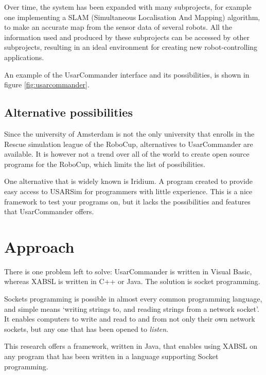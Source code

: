 \documentclass[a4paper,10pt]{article}
\begin{document}
Over time, the system has been expanded with many subprojects, for example one
implementing a SLAM
(Simultaneous Localisation And Mapping) algorithm, to make an accurate map from
the sensor data of several robots\cite{slamet2006manifoldslam}. All the information used and produced by
these subprojects can be accessed by other subprojects, resulting in an ideal
environment for creating new robot-controlling applications.

An example of the UsarCommander interface and its possibilities, is shown in
figure \ref{fig:usarcommander}.

\subsection{Alternative possibilities}
Since the university of Amsterdam is not the only university that enrolls in the
Rescue simulation league of the RoboCup, alternatives to UsarCommander are
available. It is however not a trend over all of the world to create open source
programs for the RoboCup, which limits the list of possibilities.

One alternative that is widely known is Iridium. A program created to provide
easy access to USARSim for programmers with little experience. This is a nice
framework to test your programs on, but it lacks the possibilities and features that
UsarCommander offers. 

\section{Approach}
There is one problem left to solve: UsarCommander is written in Visual Basic,
whereas XABSL is written in C++ or Java. The solution is socket programming.

Sockets programming is possible in almost every common programming language, and
simple means `writing strings to, and reading strings from a network socket'.
It enables computers to write and read to and from not only their own network
sockets, but any one that has been opened to \textit{listen}. 

This research offers a framework, written in Java, that enables using XABSL on
any program that has been written in a language supporting Socket programming.
\end{document}
